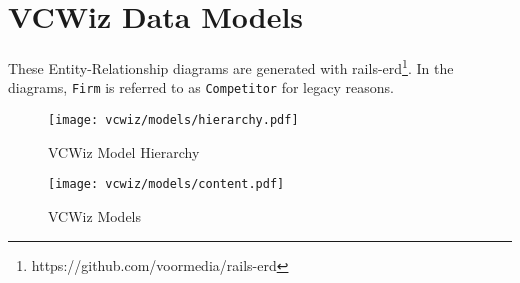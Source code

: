 \chapter{VCWiz Data Models}

These Entity-Relationship diagrams are generated with rails-erd\footnote{https://github.com/voormedia/rails-erd}. In the diagrams, \texttt{Firm} is referred to as \texttt{Competitor} for legacy reasons.

\begin{figure}
  \texttt{[image: vcwiz/models/hierarchy.pdf]}
  \caption{VCWiz Model Hierarchy}
  \label{vcwiz:model:hierarchy}
  \centering
\end{figure}

\begin{figure}
  \texttt{[image: vcwiz/models/content.pdf]}
  \caption{VCWiz Models}
  \label{vcwiz:model:content}
  \centering
\end{figure}

\clearpage
\newpage
